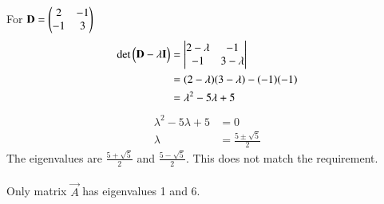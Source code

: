 \documentclass[journal]{IEEEtran}
\begin{document}
For $\mathbf{D}=\begin{pmatrix}2 & -1 \\ -1 & 3\end{pmatrix}$
\begin{align}
\det\begin{pmatrix}\mathbf{D} - \lambda \mathbf{I}\end{pmatrix} &= \begin{vmatrix}
2-\lambda & -1\\
-1 & 3-\lambda
\end{vmatrix} \\
&= (2-\lambda)(3-\lambda)-(-1)(-1) \\
&= \lambda^2 - 5\lambda + 5 \\
\end{align}
\begin{align}
\lambda^2 - 5\lambda + 5 &= 0 \\
\lambda&= \frac{5 \pm \sqrt{5}}{2}
\end{align}
The eigenvalues are $\frac{5 + \sqrt{5}}{2}$ and $\frac{5 - \sqrt{5}}{2}$. This does not match the requirement.\\\\
Only matrix $\vec{A}$ has eigenvalues 1 and 6.
\end{document}
